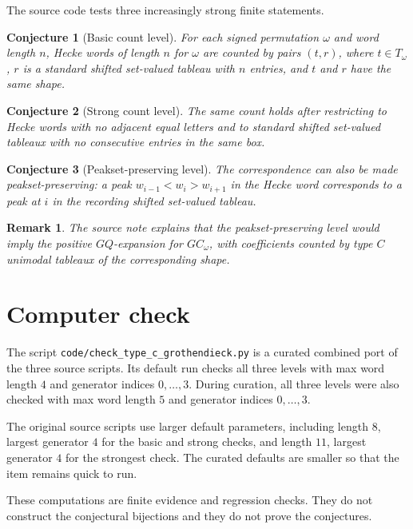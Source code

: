 \documentclass{article}
\newtheorem{conjecture}{Conjecture}
\newtheorem{remark}{Remark}
\begin{document}
The source code tests three increasingly strong finite statements.

\begin{conjecture}[Basic count level]
For each signed permutation \(\omega\) and word length \(n\), Hecke words of
length \(n\) for \(\omega\) are counted by pairs \((t,r)\), where
\(t\in T_\omega\), \(r\) is a standard shifted set-valued tableau with \(n\)
entries, and \(t\) and \(r\) have the same shape.
\end{conjecture}

\begin{conjecture}[Strong count level]
The same count holds after restricting to Hecke words with no adjacent equal
letters and to standard shifted set-valued tableaux with no consecutive entries
in the same box.
\end{conjecture}

\begin{conjecture}[Peakset-preserving level]
The correspondence can also be made peakset-preserving: a peak
\(w_{i-1}<w_i>w_{i+1}\) in the Hecke word corresponds to a peak at \(i\) in the
recording shifted set-valued tableau.
\end{conjecture}

\begin{remark}
The source note explains that the peakset-preserving level would imply the
positive \(GQ\)-expansion for \(GC_\omega\), with coefficients counted by type
\(C\) unimodal tableaux of the corresponding shape.
\end{remark}

\section{Computer check}

The script \texttt{code/check\_type\_c\_grothendieck.py} is a curated combined
port of the three source scripts.  Its default run checks all three levels with
max word length \(4\) and generator indices \(0,\ldots,3\).  During curation,
all three levels were also checked with max word length \(5\) and generator
indices \(0,\ldots,3\).

The original source scripts use larger default parameters, including length
\(8\), largest generator \(4\) for the basic and strong checks, and length
\(11\), largest generator \(4\) for the strongest check.  The curated defaults
are smaller so that the item remains quick to run.

These computations are finite evidence and regression checks.  They do not
construct the conjectural bijections and they do not prove the conjectures.
\end{document}
